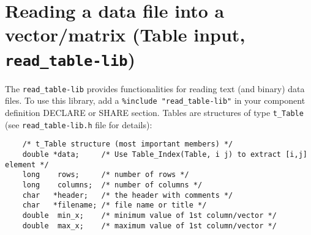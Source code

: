\section{Reading a data file into a vector/matrix (Table input, \texttt{read\_table-lib})}
\label{s:read-table}
  The \verb+read_table-lib+ provides functionalities for reading text
  (and binary) data files. To use this library,
  add a \verb+%include "read_table-lib"+ in your component definition
  DECLARE or SHARE section. Tables are structures of type \verb+t_Table+
  (see \verb+read_table-lib.h+ file for details):
\begin{verbatim}
    /* t_Table structure (most important members) */
    double *data;     /* Use Table_Index(Table, i j) to extract [i,j] element */
    long    rows;     /* number of rows */
    long    columns;  /* number of columns */
    char   *header;   /* the header with comments */
    char   *filename; /* file name or title */
    double  min_x;    /* minimum value of 1st column/vector */
    double  max_x;    /* maximum value of 1st column/vector */
\end{verbatim}


